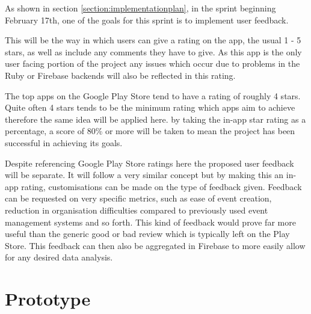 As shown in section \ref{section:implementationplan}, in the sprint beginning February 17th, one of the goals for this sprint is to implement user feedback.

This will be the way in which users can give a rating on the app, the usual 1 - 5 stars, as well as include any comments they have to give. As this app is the only user facing portion of the project any issues which occur due to problems in the Ruby or Firebase backends will also be reflected in this rating.

The top apps on the Google Play Store tend to have a rating of roughly 4 stars\cite{appstorerating}. Quite often 4 stars tends to be the minimum rating which apps aim to achieve therefore the same idea will be applied here. by taking the in-app star rating as a percentage, a score of 80\% or more will be taken to mean the project has been successful in achieving its goals.

Despite referencing Google Play Store ratings here the proposed user feedback will be separate. It will follow a very similar concept but by making this an in-app rating, customisations can be made on the type of feedback given. Feedback can be requested on very specific metrics, such as ease of event creation, reduction in organisation difficulties compared to previously used event management systems and so forth. This kind of feedback would prove far more useful than the generic good or bad review which is typically left on the Play Store. This feedback can then also be aggregated in Firebase to more easily allow for any desired data analysis.

\section{Prototype}
\label{section:prototype}

